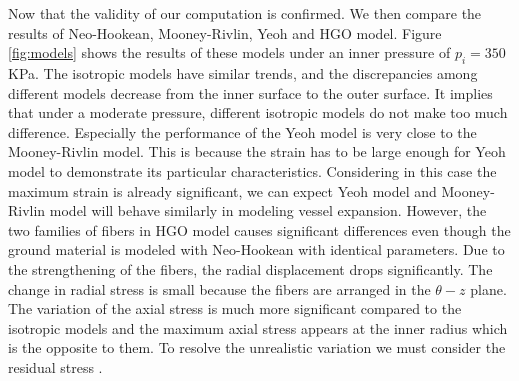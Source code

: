 Now that the validity of our computation is confirmed. We then compare the results of Neo-Hookean, Mooney-Rivlin, Yeoh and HGO model. Figure \ref{fig:models} shows the results of these models under an inner pressure of $p_i = 350$ KPa. The isotropic models have similar trends, and the discrepancies among different models decrease from the inner surface to the outer surface. It implies that under a moderate pressure, different isotropic models do not make too much difference. Especially the performance of the Yeoh model is very close to the Mooney-Rivlin model. This is because the strain has to be large enough for Yeoh model to demonstrate its particular characteristics. Considering in this case the maximum strain is already significant, we can expect Yeoh model and Mooney-Rivlin model will behave similarly in modeling vessel expansion. However, the two families of fibers in HGO model causes significant differences even though the ground material is modeled with Neo-Hookean with identical parameters. Due to the strengthening of the fibers, the radial displacement drops significantly. The change in radial stress is small because the fibers are arranged in the $\theta-z$ plane. The variation of the axial stress is much more significant compared to the isotropic models and the maximum axial stress appears at the inner radius which is the opposite to them. To resolve the unrealistic variation we must consider the residual stress \cite{Fung, Fung2}.

